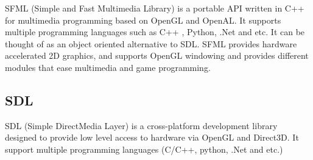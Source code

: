 S\+F\+M\+L (Simple and Fast Multimedia Library) is a portable A\+P\+I written in C++ for multimedia programming based on Open\+G\+L and Open\+A\+L. It supports multiple programming languages such as C++ , Python, .Net and etc. It can be thought of as an object oriented alternative to S\+D\+L. S\+F\+M\+L provides hardware accelerated 2\+D graphics, and supports Open\+G\+L windowing and provides different modules that ease multimedia and game programming. \cite{sfml} \hypertarget{_game_development_GameDevelopmentMultimediaLibrariesSDL}{}\subsection{S\+D\+L}\label{_game_development_GameDevelopmentMultimediaLibrariesSDL}
S\+D\+L (Simple Direct\+Media Layer) is a cross-\/platform development library designed to provide low level access to hardware via Open\+G\+L and Direct3\+D. It support multiple programming languages (C/\+C++, python, .Net and etc.) \cite{sdl} 
